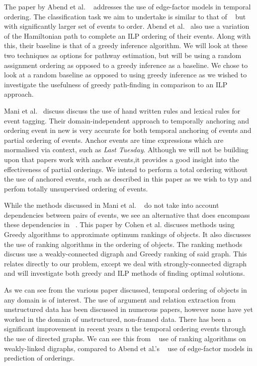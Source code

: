 \documentclass[bsc,frontabs,twoside,singlespacing,parskip,deptreport]{infthesis}     %
\begin{document}
The paper by  Abend et al. ~\cite{abend2015lexical} addresses the use of
edge-factor models in temporal ordering. The classification task we aim to undertake is similar to that of ~\cite{abend2015lexical}
but with significantly larger set of events to order.
Abend et al.~\cite{abend2015lexical} also use a variation of the Hamiltonian path
to complete an ILP ordering of their events. Along with this, their baseline is that of a greedy inference algorithm.
We will look at these two techniques as options for pathway estimation, but will be using a random assignment ordering as
opposed to a greedy inference as a baseline. We chose to look at a random baseline as opposed to using greedy inference as
we wished to investigate the usefulness of greedy path-finding in comparison to an ILP approach.

Mani et al.~\cite{mani2006machine} discuss discuss the use of hand written rules and lexical rules for event tagging.
Their domain-independent approach to temporally anchoring and ordering event in new is very accurate for both temporal
anchoring of events and partial ordering of events. Anchor events are time expressions which are mormalised via
context, such as \textit{Last Tuesday}. Although we will not be building upon that papers work with
anchor events,it provides a good insight into the effectiveness of
partial orderings. We intend to perform a total ordering without the use of anchored events, such as described in this paper
as we wish to typ and perfom totally unsupervised ordering of events.

While the methods discussed in Mani et al. ~\cite{mani2006machine} do not take into account dependencies between pairs of events, 
we see an alternative that does encompass
these dependencies in ~\cite{schapire1998learning}.
This paper by Cohen et al. discuses methods using Greedy algorithms to approximate optimum rankings of objects.
It also discusses the use of ranking algorithms in the ordering of objects. The ranking methods discuss use a
weakly-connected digraph and Greedy ranking of said graph. This relates directly to our problem,
except we deal with strongly-connected digraph and will investigate both greedy and ILP methods of finding
optimal solutions.


As we can see from the various paper discussed, temporal ordering of objects in any domain is of interest.
The use of argument and relation extraction from unstructured data has been discussed in numerous papers,
however none have yet worked in the domain of unstructured, non-framed data.
There has been a significant improvement in recent years n the temporal ordering events through the use of
directed graphs. We can see this from ~\cite{schapire1998learning} use of ranking algorithms on weakly-linked
digraphs, compared to Abend et al.'s ~\cite{abend2015lexical} use of edge-factor models in prediction of orderings. 
\end{document}

